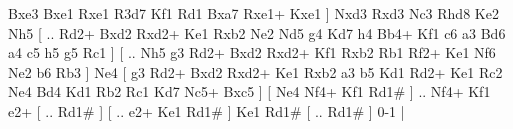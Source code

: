  Bxe3 Bxe1  Rxe1 R3d7  Kf1 Rd1  Bxa7 Rxe1+  Kxe1   ]  Nxd3   Rxd3    Nc3   Rhd8    Ke2   Nh5 [ .. Rd2+  Bxd2 Rxd2+  Ke1 Rxb2  Ne2 Nd5  g4 Kd7  h4 Bb4+  Kf1 c6  a3 Bd6  a4 c5  h5 g5  Rc1   ]  [ .. Nh5  g3 Rd2+  Bxd2 Rxd2+  Kf1 Rxb2  Rb1 Rf2+  Ke1 Nf6  Ne2 b6  Rb3   ]  Ne4 [  g3 Rd2+  Bxd2 Rxd2+  Ke1 Rxb2  a3 b5  Kd1 Rd2+  Ke1 Rc2  Ne4 Bd4  Kd1 Rb2  Rc1 Kd7  Nc5+ Bxc5   ]  [  Ne4 Nf4+  Kf1 Rd1#   ] .. Nf4+    Kf1   e2+ [ .. Rd1#   ]  [ .. e2+  Ke1 Rd1#   ]  Ke1  Rd1#    [ .. Rd1#   ] 0-1  |
